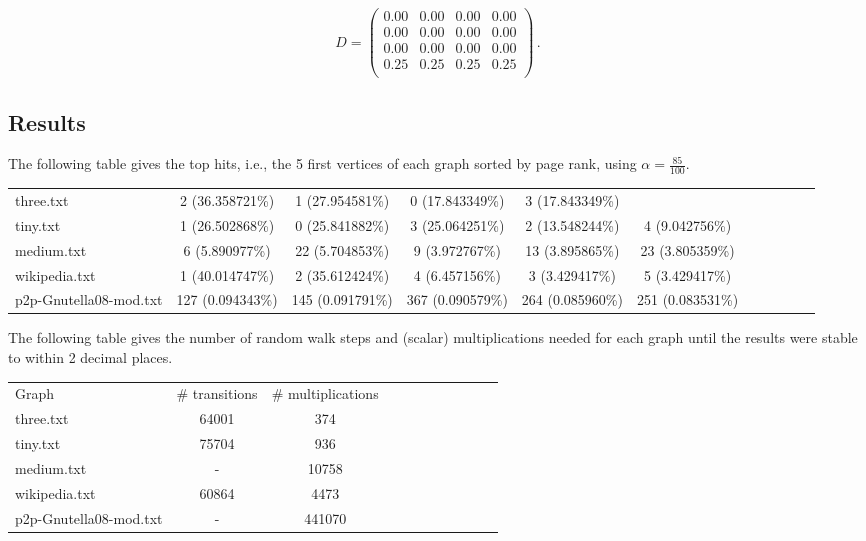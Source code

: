 \documentclass{tufte-handout}
\begin{document}
\begin{equation*}
D =
\left(
\begin{array}{cccc}
0.00 & 0.00 & 0.00 & 0.00 \\
0.00 & 0.00 & 0.00 & 0.00 \\
0.00 & 0.00 & 0.00 & 0.00 \\
0.25 & 0.25 & 0.25 & 0.25 \\
\end{array}
\right)\,.
\end{equation*}

\subsection{Results}

The following table gives the top hits, i.e., the 5 first vertices of
each graph sorted by page rank, using $\alpha = \frac{85}{100}$.



\medskip
\begin{fullwidth}
\small
\begin{tabular}{lcccccccccc}
three.txt & 2 (36.358721\%) & 1 (27.954581\%) & 0 (17.843349\%) & 3 (17.843349\%) \\
tiny.txt &  1 (26.502868\%) & 0 (25.841882\%) & 3 (25.064251\%) & 2 (13.548244\%) & 4 (9.042756\%) \\
medium.txt & 6 (5.890977\%)  & 22 (5.704853\%)  & 9 (3.972767\%) & 13 (3.895865\%) & 23 (3.805359\%) \\
wikipedia.txt & 1 (40.014747\%)  &2 (35.612424\%)  &4 (6.457156\%)  &3 (3.429417\%)  &5 (3.429417\%)  \\
p2p-Gnutella08-mod.txt & 127 (0.094343\%)  &145 (0.091791\%)  &367 (0.090579\%)  &264 (0.085960\%)  &251 (0.083531\%)  &
\end{tabular}
\end{fullwidth}

\bigskip The following table gives the number of random walk steps and
(scalar) multiplications needed for each graph until the results were
stable to within 2 decimal places.

\medskip
\begin{fullwidth}
\small
\begin{tabular}{lcccccccccc}
Graph & \# transitions  & \# multiplications \\
three.txt & 64001 & 374 \\
tiny.txt & 75704 & 936\\
medium.txt & - & 10758\\
wikipedia.txt & 60864 & 4473\\
p2p-Gnutella08-mod.txt & - & 441070
\end{tabular}
\end{fullwidth}
\end{document}
